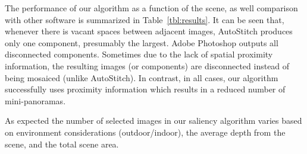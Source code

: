 The performance of our algorithm as a function of the scene, as well
comparison with other software is summarized in
Table~\ref{tbl:results}.  It can be seen that, whenever there is
vacant spaces between adjacent images, AutoStitch produces only
one component, presumably the largest.  Adobe Photoshop outputs all disconnected
components. Sometimes due to the lack of spatial proximity
information, the resulting images (or components) are disconnected instead of being 
mosaiced (unlike AutoStitch). In contrast, in all cases, our algorithm
successfully uses proximity information which results in a reduced number of mini-panoramas. 

As expected the number of selected images in our saliency algorithm
varies based on environment considerations (outdoor/indoor), the
average depth from the scene, and the total scene area.
 
